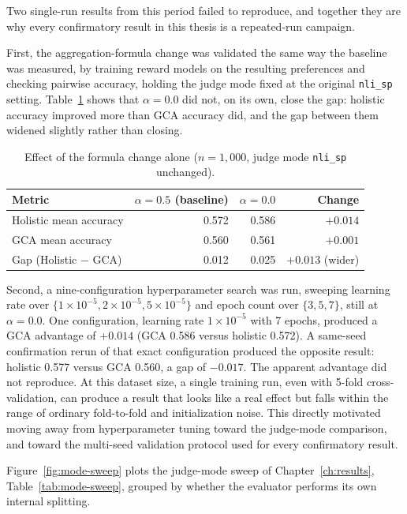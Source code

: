 Two single-run results from this period failed to reproduce, and together they
are why every confirmatory result in this thesis is a repeated-run campaign.

First, the aggregation-formula change was validated the same way the baseline
was measured, by training reward models on the resulting preferences and
checking pairwise accuracy, holding the judge mode fixed at the original
\texttt{nli\_sp} setting. Table~\ref{tab:alpha0-validation} shows that $\alpha =
0.0$ did not, on its own, close the gap: holistic accuracy improved more than
GCA accuracy did, and the gap between them widened slightly rather than closing.

\begin{table}[htbp]
\centering
\caption[Effect of the aggregation-formula change alone]{Effect of the formula change alone ($n=1{,}000$, judge mode
\texttt{nli\_sp} unchanged).}
\label{tab:alpha0-validation}
\begin{tabular}{lrrr}
\toprule
Metric & $\alpha=0.5$ (baseline) & $\alpha=0.0$ & Change \\
\midrule
Holistic mean accuracy & 0.572 & 0.586 & $+0.014$ \\
GCA mean accuracy      & 0.560 & 0.561 & $+0.001$ \\
Gap (Holistic $-$ GCA) & 0.012 & 0.025 & $+0.013$ (wider) \\
\bottomrule
\end{tabular}
\end{table}

Second, a nine-configuration hyperparameter search was run, sweeping learning rate
over $\{1\times10^{-5}, 2\times10^{-5}, 5\times10^{-5}\}$ and epoch count over
$\{3, 5, 7\}$, still at $\alpha = 0.0$. One configuration, learning rate
$1\times10^{-5}$ with 7 epochs, produced a GCA advantage of $+0.014$ (GCA 0.586
versus holistic 0.572). A same-seed confirmation rerun of that exact
configuration produced the opposite result: holistic 0.577 versus GCA 0.560,
a gap of $-0.017$. The apparent advantage did not reproduce. At this dataset
size, a single training run, even with 5-fold cross-validation, can produce a
result that looks like a real effect but falls within the range of ordinary
fold-to-fold and initialization noise. This directly motivated moving away from
hyperparameter tuning toward the judge-mode comparison, and toward the
multi-seed validation protocol used for every confirmatory result.

Figure~\ref{fig:mode-sweep} plots the judge-mode sweep of
Chapter~\ref{ch:results}, Table~\ref{tab:mode-sweep}, grouped by whether the
evaluator performs its own internal splitting.

